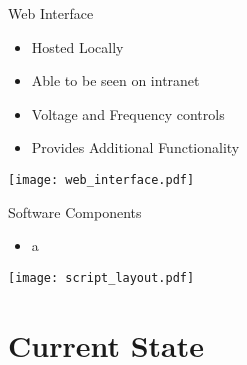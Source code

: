 \begin{frame}{Web Interface}
\begin{multicols}{2}
  \begin{itemize}
    \item Hosted Locally
    \item Able to be seen on intranet
    \item Voltage and Frequency controls
    \item Provides Additional Functionality
  \end{itemize}

\newpage

\begin{center}
\texttt{[image: web\_interface.pdf]}
\end{center}

\end{multicols}
\end{frame}

\begin{frame}{Software Components}
\begin{multicols}{2}
  \begin{itemize}
    \item a
  \end{itemize}


\newpage

\begin{center}
\texttt{[image: script\_layout.pdf]}
\end{center}

\end{multicols}
\end{frame}

\section{Current State}

